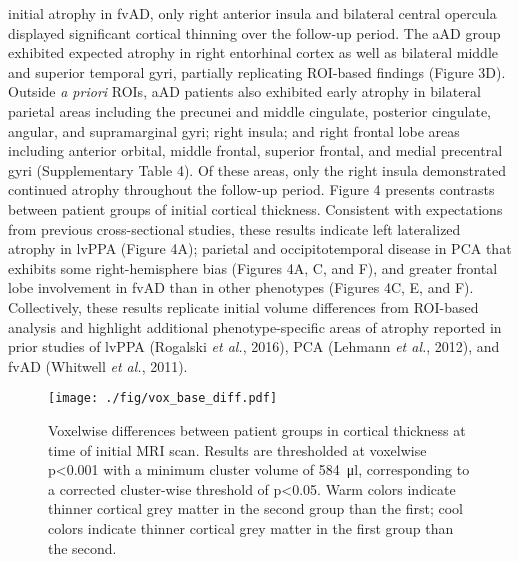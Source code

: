 \documentclass[]{article}
\begin{document}
initial atrophy in fvAD, only right anterior insula and bilateral
central opercula displayed significant cortical thinning over the
follow-up period. The aAD group exhibited expected atrophy in right
entorhinal cortex as well as bilateral middle and superior temporal
gyri, partially replicating ROI-based findings (Figure 3D). Outside
\emph{a priori} ROIs, aAD patients also exhibited early atrophy in
bilateral parietal areas including the precunei and middle cingulate,
posterior cingulate, angular, and supramarginal gyri; right insula; and
right frontal lobe areas including anterior orbital, middle frontal,
superior frontal, and medial precentral gyri (Supplementary Table 4). Of
these areas, only the right insula demonstrated continued atrophy
throughout the follow-up period. Figure 4 presents contrasts between
patient groups of initial cortical thickness. Consistent with
expectations from previous cross-sectional studies, these results
indicate left lateralized atrophy in lvPPA (Figure 4A); parietal and
occipitotemporal disease in PCA that exhibits some right-hemisphere bias
(Figures 4A, C, and F), and greater frontal lobe involvement in fvAD
than in other phenotypes (Figures 4C, E, and F). Collectively, these
results replicate initial volume differences from ROI-based analysis and
highlight additional phenotype-specific areas of atrophy reported in
prior studies of lvPPA (Rogalski \emph{et al.}, 2016), PCA (Lehmann
\emph{et al.}, 2012), and fvAD (Whitwell \emph{et al.}, 2011).

\begin{figure}[]

{\centering \texttt{[image: ./fig/vox\_base\_diff.pdf]} 

}

\caption[GM mean differences]{Voxelwise differences between patient groups in cortical thickness at time of initial MRI scan. Results are thresholded at voxelwise p<0.001 with a minimum cluster volume of \SI{584}{\micro\litre}, corresponding to a corrected cluster-wise threshold of p<0.05. Warm colors indicate thinner cortical grey matter in the second group than the first; cool colors indicate thinner cortical grey matter in the first group than the second. \label{gm_mean_diff}}

\end{figure}
\end{document}
